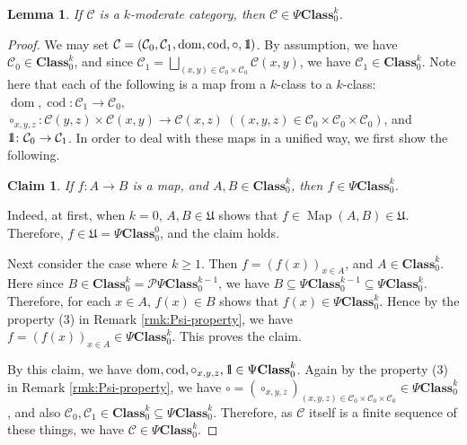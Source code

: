 \documentclass{surv-l}
\numberwithin{equation}{chapter}
\numberwithin{figure}{chapter}
\theoremstyle{plain}
\newtheorem{lem}[thm]{Lemma}
\newtheorem*{clm-nn}{Claim}
\theoremstyle{definition}
\theoremstyle{remark}
\newcommand{\id}{1\kern-.25em{\text{{\rm l}}}}
\DeclareMathOperator{\dom}{dom}
\DeclareMathOperator{\cod}{cod}
\DeclareMathOperator{\Map}{Map}
\begin{document}
\begin{lem}\label{lem:k-modt-cat}
If ${\mathcal{C}}$ is a $k$-moderate category,
then ${\mathcal{C}} \in \Psi\mathbf{Class}^k_0$.
\end{lem}

\begin{proof}
We may set ${\mathcal{C}} = ({\mathcal{C}}_0, {\mathcal{C}}_1, \dom, \cod, \circ, \id)$.
By assumption, we have ${\mathcal{C}}_0 \in \mathbf{Class}^k_0$, and since
${\mathcal{C}}_1 = \bigsqcup_{(x,y) \in {\mathcal{C}}_0 \times {\mathcal{C}}_0}{\mathcal{C}}(x, y)$,
we have ${\mathcal{C}}_1 \in \mathbf{Class}^k_0$.
Note here that each of the following is a map
from a $k$-class to a $k$-class:
$\dom, \cod \colon {\mathcal{C}}_1 \to {\mathcal{C}}_0$,
$\circ_{x,y,z}\colon {\mathcal{C}}(y,z) \times {\mathcal{C}}(x,y) \to {\mathcal{C}}(x,z)
\ ((x,y,z) \in {\mathcal{C}}_0 \times {\mathcal{C}}_0 \times {\mathcal{C}}_0)$, and
$\id \colon {\mathcal{C}}_0 \to {\mathcal{C}}_1$.
In order to deal with these maps in a unified way,
we first show the following.
\begin{clm-nn}
If $f \colon A \to B$ is a map, and $A, B \in \mathbf{Class}^k_0$,
then $f \in \Psi\mathbf{Class}^k_0$.
\end{clm-nn}
Indeed, at first, when $k = 0$,
$A, B \in \mathfrak{U}$ shows that $f \in \Map(A, B) \in \mathfrak{U}$.
Therefore, $f \in \mathfrak{U} = \Psi\mathbf{Class}^0_0$, and the claim holds.

Next consider the case where $k \ge 1$.
Then $f = (f(x))_{x \in A}$, and $A \in \mathbf{Class}^k_0$.
Here since $B \in \mathbf{Class}^k_0 = \mathcal{P}\Psi\mathbf{Class}^{k-1}_0$, we have
$B \subseteq \Psi\mathbf{Class}^{k-1}_0 \subseteq \Psi\mathbf{Class}^{k}_0$.
Therefore, for each $x \in A$, $f(x) \in B$ shows that
$f(x) \in \Psi\mathbf{Class}^{k}_0$.
Hence by the property (3) in Remark \ref{rmk:Psi-property},
we have $f = (f(x))_{x \in A} \in \Psi\mathbf{Class}^{k}_0$.
This proves the claim.

By this claim, we have
$\dom, \cod, \circ_{x,y,z}, \id \in \Psi\mathbf{Class}^k_0$.
Again by the property (3) in Remark \ref{rmk:Psi-property},
we have
$\circ= (\circ_{x,y,z})_{(x,y,z) \in {\mathcal{C}}_0 \times {\mathcal{C}}_0 \times {\mathcal{C}}_0} \in \Psi\mathbf{Class}^k_0$,
and also ${\mathcal{C}}_0, {\mathcal{C}}_1 \in \mathbf{Class}^k_0 \subseteq \Psi\mathbf{Class}^k_0$.
Therefore, as ${\mathcal{C}}$ itself is a finite sequence of these things,
we have ${\mathcal{C}} \in \Psi\mathbf{Class}^k_0$.
\end{proof}
\end{document}
